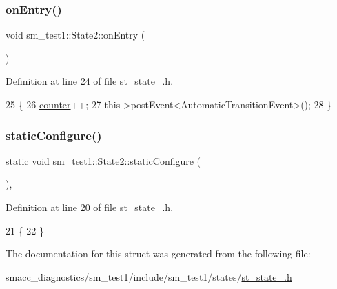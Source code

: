 \subsubsection{\texorpdfstring{on\+Entry()}{onEntry()}}
{\footnotesize\ttfamily void sm\+\_\+test1\+::\+State2\+::on\+Entry (\begin{DoxyParamCaption}{ }\end{DoxyParamCaption})\hspace{0.3cm}{\ttfamily [inline]}}



Definition at line 24 of file st\+\_\+state\+\_.\+h.


\begin{DoxyCode}
25     \{
26         \hyperlink{namespacesm__test1_a807de4a3a915676ba97cad1d6e0f1318}{counter}++;
27         this->postEvent<AutomaticTransitionEvent>();
28     \}
\end{DoxyCode}
\mbox{\label{structsm__test1_1_1State2_a533c34b9588cdc47090affe78971773b}} 
\subsubsection{\texorpdfstring{static\+Configure()}{staticConfigure()}}
{\footnotesize\ttfamily static void sm\+\_\+test1\+::\+State2\+::static\+Configure (\begin{DoxyParamCaption}{ }\end{DoxyParamCaption})\hspace{0.3cm}{\ttfamily [inline]}, {\ttfamily [static]}}



Definition at line 20 of file st\+\_\+state\+\_.\+h.


\begin{DoxyCode}
21     \{
22     \}
\end{DoxyCode}


The documentation for this struct was generated from the following file\+:\begin{DoxyCompactItemize}
\item 
smacc\+\_\+diagnostics/sm\+\_\+test1/include/sm\+\_\+test1/states/\hyperlink{smacc__diagnostics_2sm__test1_2include_2sm__test1_2states_2st__state__2_8h}{st\+\_\+state\+\_.\+h}\end{DoxyCompactItemize}
